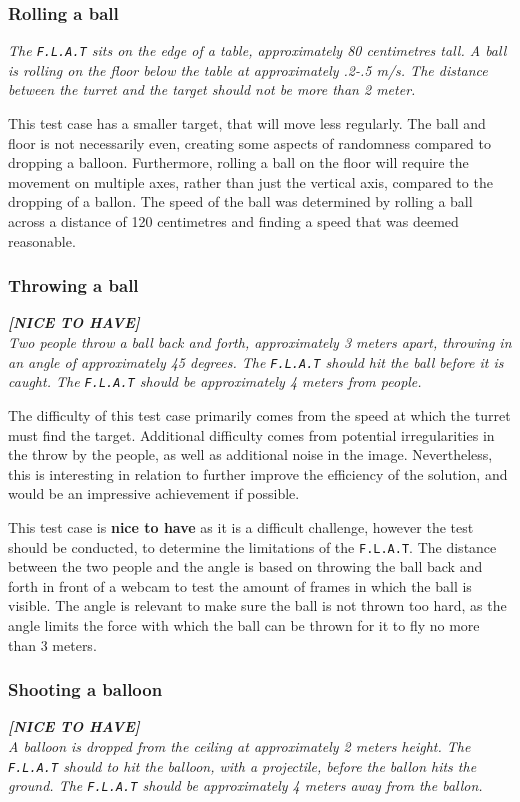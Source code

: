 \subsubsection{Rolling a ball}
\textit{The \texttt{F.L.A.T} sits on the edge of a table, approximately 80 centimetres tall.
A ball is rolling on the floor below the table at approximately .2-.5 m/s. 
The distance between the turret and the target should not be more than 2 meter.}

This test case has a smaller target, that will move less regularly.
The ball and floor is not necessarily even, creating some aspects of randomness compared to dropping a balloon.
Furthermore, rolling a ball on the floor will require the movement on multiple axes, rather than just the vertical axis, compared to the dropping of a ballon.
The speed of the ball was determined by rolling a ball across a distance of 120 centimetres and finding a speed that was deemed reasonable.

\subsubsection{Throwing a ball}
\textit{\textbf{[NICE TO HAVE]}}\\
\textit{Two people throw a ball back and forth, approximately 3 meters apart, throwing in an angle of approximately 45 degrees.
The \texttt{F.L.A.T} should hit the ball before it is caught.
The \texttt{F.L.A.T} should be approximately 4 meters from people.}

The difficulty of this test case primarily comes from the speed at which the turret must find the target.
Additional difficulty comes from potential irregularities in the throw by the people, as well as additional noise in the image.
Nevertheless, this is interesting in relation to further improve the efficiency of the solution, and would be an impressive achievement if possible.

This test case is \textbf{nice to have} as it is a difficult challenge, however the test should be conducted, to determine the limitations of the \texttt{F.L.A.T}.
The distance between the two people and the angle is based on throwing the ball back and forth in front of a webcam to test the amount of frames in which the ball is visible.
The angle is relevant to make sure the ball is not thrown too hard, as the angle limits the force with which the ball can be thrown for it to fly no more than 3 meters. 

\subsubsection{Shooting a balloon}
\textit{\textbf{[NICE TO HAVE]}}\\
\textit{A balloon is dropped from the ceiling at approximately 2 meters height.	
The \texttt{F.L.A.T} should to hit the balloon, with a projectile, before the ballon hits the ground.
The \texttt{F.L.A.T} should be approximately 4 meters away from the ballon.}

